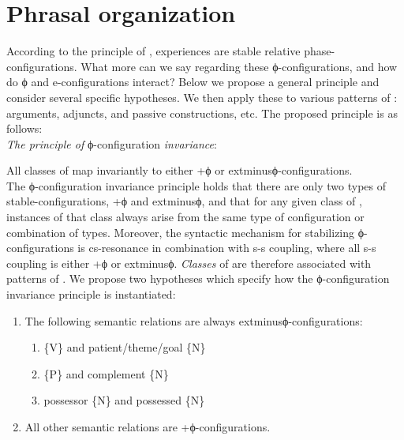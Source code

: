 \section{Phrasal organization}

According to the principle of ,  experiences are stable relative phase-configurations. What more can we say regarding these ϕ-configurations, and how do ϕ and e-configurations interact? Below we propose a general principle and consider several specific hypotheses. We then apply these to various patterns of : arguments, adjuncts,  and passive constructions, etc. The proposed principle is as follows:\\

\noindent\textit{The principle of} ϕ-configuration \textit{invariance}: 

\noindent All classes of  map invariantly to either +ϕ or 	extminus{}ϕ-con\-fig\-u\-ra\-tions. \\

  The ϕ-configuration invariance principle holds that there are only two types of stable-configurations, +ϕ and 	extminus{}ϕ, and that for any given class of , instances of that class always arise from the same type of configuration or combination of types. Moreover, the syntactic mechanism for stabilizing ϕ-configurations is cs-resonance in combination with s-s coupling, where all s-s coupling is either +ϕ or 	extminus{}ϕ. \textit{Classes} of  are therefore associated with patterns of . We propose two hypotheses which specify how the ϕ-configuration invariance principle is instantiated:
  
\begin{enumerate}
\item The following semantic relations are always 	extminus{}ϕ-configurations:
\begin{enumerate}
  \item \{V\} and patient/theme/goal \{N\}
  \item {} \{P\} and complement \{N\}
  \item possessor \{N\} and possessed \{N\}
\end{enumerate}
\item  All other semantic relations are +ϕ-configurations.
\end{enumerate}

